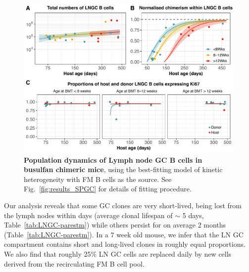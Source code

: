 \documentclass[11pt]{article}
\begin{document}
    \begin{figure}[htbp]
    	\centerline{\includegraphics[scale = 0.85] {Results_LNGC_FM.pdf}}
    		\caption{ \textbf{Population dynamics of Lymph node GC B cells in busulfan chimeric mice}, using the best-fitting model of kinetic heterogeneity with FM B cells as the source. See Fig.~\ref{fig:results_SPGC} for details of fitting procedure.}
    		\label{fig:results_LNGC}
    \end{figure}
	
	
	


Our analysis reveals that some GC clones are  very short-lived, being lost from the lymph nodes within days (average clonal lifespan of $\sim$ 5 days, Table~\ref{tab:LNGC-parestm}) while others persist for on average 2 months (Table~\ref{tab:LNGC-parestm}).
In a 7 week old mouse, we infer that the LN GC compartment contains short and long-lived clones in roughly equal proportions. We also find that roughly 25\% LN GC cells are replaced daily by new cells derived from the recirculating FM B cell pool.
\end{document}
